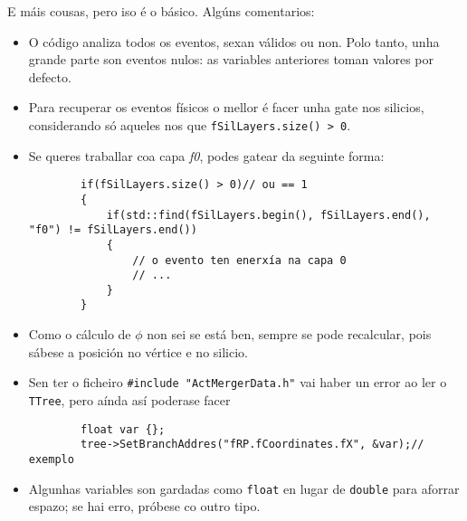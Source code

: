 \documentclass[11pt, a4paper, galician]{article}
\begin{document}
E máis cousas, pero iso é o básico. Algúns comentarios:
\begin{itemize}
    \item O código analiza todos os eventos, sexan válidos ou non. Polo tanto, unha grande parte son eventos nulos: as variables anteriores toman valores por defecto.
    \item Para recuperar os eventos físicos o mellor é facer unha gate nos silicios, considerando só aqueles nos que \lstinline|fSilLayers.size() > 0|.
    \item Se queres traballar coa capa \textit{f0}, podes gatear da seguinte forma:
    \begin{lstlisting}
        if(fSilLayers.size() > 0)// ou == 1
        {
            if(std::find(fSilLayers.begin(), fSilLayers.end(), "f0") != fSilLayers.end())
            {
                // o evento ten enerxía na capa 0
                // ...
            }
        }
    \end{lstlisting}
    \item Como o cálculo de $\phi$ non sei se está ben, sempre se pode recalcular, pois sábese a posición no vértice e no silicio.
    \item Sen ter o ficheiro \lstinline|#include "ActMergerData.h"| vai haber un error ao ler o \lstinline|TTree|, pero aínda así poderase facer 
    \begin{lstlisting}
        float var {};
        tree->SetBranchAddres("fRP.fCoordinates.fX", &var);// exemplo
    \end{lstlisting}
    \item Algunhas variables son gardadas como \lstinline|float| en lugar de \lstinline|double| para aforrar espazo; se hai erro, próbese co outro tipo.
\end{itemize}
\end{document}
